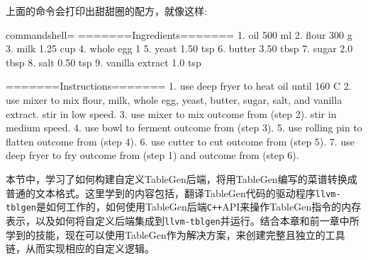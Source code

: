 \begin{itemize}
上面的命令会打印出甜甜圈的配方，就像这样:

\begin{tcblisting}{commandshell={}}
=======Ingredients=======
1. oil 500 ml
2. flour 300 g
3. milk 1.25 cup
4. whole egg 1
5. yeast 1.50 tsp
6. butter 3.50 tbsp
7. sugar 2.0 tbsp
8. salt 0.50 tsp
9. vanilla extract 1.0 tsp

=======Instructions=======
1. use deep fryer to heat oil until 160 C
2. use mixer to mix flour, milk, whole egg, yeast,
butter, sugar, salt, and vanilla extract. stir in low
speed.
3. use mixer to mix outcome from (step 2). stir in medium
speed.
4. use bowl to ferment outcome from (step 3).
5. use rolling pin to flatten outcome from (step 4).
6. use cutter to cut outcome from (step 5).
7. use deep fryer to fry outcome from (step 1) and
outcome from (step 6).
\end{tcblisting}

\end{itemize}

本节中，学习了如何构建自定义TableGen后端，将用TableGen编写的菜谱转换成普通的文本格式。这里学到的内容包括，翻译TableGen代码的驱动程序\texttt{llvm-tblgen}是如何工作的，如何使用TableGen后端\texttt{C++}API来操作TableGen指令的内存表示，以及如何将自定义后端集成到\texttt{llvm-tblgen}并运行。结合本章和前一章中所学到的技能，现在可以使用TableGen作为解决方案，来创建完整且独立的工具链，从而实现相应的自定义逻辑。













































